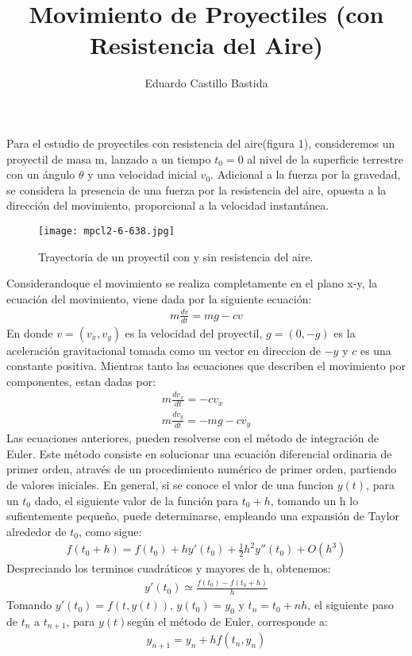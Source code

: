 \documentclass[12pt,a4paper,twoside]{article}
\author{Eduardo Castillo Bastida}
\title{\textbf{Movimiento de Proyectiles (con Resistencia del Aire)}}
\begin{document}
\maketitle
Para el estudio de proyectiles con resistencia del aire(figura 1), consideremos un proyectil de masa m, lanzado a un tiempo $t_{0}=0$ al nivel de la superficie terrestre con un ángulo $\theta$ y una velocidad inicial $v_{0}$. Adicional a la fuerza por la gravedad, se considera la presencia de una fuerza por la resistencia del aire, opuesta a la dirección del movimiento, proporcional a la velocidad instantánea.
\begin{figure}[htbp]
\centering
\texttt{[image: mpcl2-6-638.jpg]}
\caption{Trayectoria de un proyectil con y sin resistencia del aire.}\label{fig:figura1}
\end{figure}

Considerandoque el movimiento se realiza completamente en el plano x-y, la ecuación del movimiento, viene dada por la siguiente ecuación:
\begin{eqnarray}
m\frac{dv}{dt}=mg-cv
\end{eqnarray}
En donde $v=(v_{x},v_{y})$ es la velocidad del proyectil, $g=(0,-g)$ es la aceleración gravitacional tomada como un vector en direccion de $-y$ y $c$ es una constante positiva. 
Mientras tanto las ecuaciones que describen el movimiento por componentes, estan dadas por:
\begin{eqnarray}
m\frac{dv_{x}}{dt}=-cv_{x}\nonumber\\
m\frac{dv_{y}}{dt}=-mg-cv_{y}
\end{eqnarray}
 Las ecuaciones anteriores, pueden resolverse con el método de integración de Euler. Este método consiste en solucionar una ecuación diferencial ordinaria de primer orden, através de un procedimiento numérico de primer orden, partiendo de valores iniciales. 
En general, si se conoce el valor de una funcion $y(t)$, para un $t_{0}$ dado, el siguiente valor de la función para $t_{0}+h$, tomando un h lo sufientemente pequeño, puede  determinarse, empleando una expansión de Taylor alrededor de $t_{0}$, como sigue:
\begin{eqnarray}
f(t_{0}+h)=f(t_{0})+hy'(t_{0})+\frac{1}{2}h^{2}y''(t_{0})+O(h^{3})
\end{eqnarray}
Despreciando los terminos cuadráticos y mayores de h, obtenemos:
\begin{eqnarray}
y'(t_{0})\simeq\frac{f(t_{0})-f(t_{0}+h)}{h}
\end{eqnarray}
Tomando $y'(t_{0})=f(t,y(t))$, $y(t_{0})=y_{0}$ y $t_{n}=t_{0}+nh$, el siguiente paso de $t_{n}$ a $t_{n+1}$, para $y(t)$según el método de Euler, corresponde a:
\begin{eqnarray}
y_{n+1}=y_{n}+hf(t_{n},y_{n})
\end{eqnarray}
\end{document}
